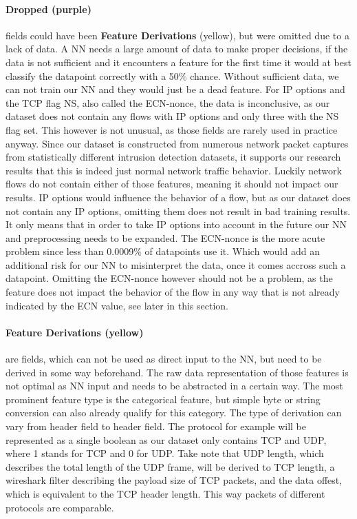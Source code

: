 \documentclass[
	ngerman,
	ruledheaders=section,%
	class=report,%
	thesis={type=bachelor},%
	accentcolor=9c,%
	custommargins=true,%
	marginpar=false,%
	parskip=half-,%
	fontsize=11pt,%
]{tudapub}
\begin{document}
\paragraph{\colorbox{dropped}{\textbf{Dropped} (purple)}} fields could have been \colorbox{derivation}{\textbf{Feature Derivations} (yellow)}, but were omitted due to a lack of data.
A NN needs a large amount of data to make proper decisions, if the data is not sufficient and it encounters a feature for the first time it would at best classify the datapoint correctly with a 50\% chance.
Without sufficient data, we can not train our NN and they would just be a dead feature.
For IP options and the TCP flag NS, also called the ECN-nonce, the data is inconclusive,
as our dataset does not contain any flows with IP options and only three with the NS flag set.
This however is not unusual, as those fields are rarely used in practice anyway.
Since our dataset is constructed from numerous network packet captures from statistically different intrusion detection datasets,
it supports our research results that this is indeed just normal network traffic behavior.
Luckily network flows do not contain either of those features, meaning it should not impact our results.
IP options would influence the behavior of a flow, but as our dataset does not contain any IP options, omitting them does not result in bad training results.
It only means that in order to take IP options into account in the future our NN and preprocessing needs to be expanded.
The ECN-nonce is the more acute problem since less than 0.0009\% of datapoints use it. %
Which would add an additional risk for our NN to misinterpret the data, once it comes accross such a datapoint.
Omitting the ECN-nonce however should not be a problem, as the feature does not impact the behavior of the flow in any way that is not already indicated by the ECN value, see later in this section.

\paragraph{\colorbox{derivation}{\textbf{Feature Derivations} (yellow)}} are fields, which can not be used as direct input to the NN,
but need to be derived in some way beforehand.
The raw data representation of those features is not optimal as NN input and needs to be abstracted in a certain way.
The most prominent feature type is the categorical feature, but simple byte or string conversion can also already qualify for this category.
The type of derivation can vary from header field to header field.
The protocol for example will be represented as a single boolean as our dataset only contains TCP and UDP, where 1 stands for TCP and 0 for UDP.
Take note that UDP length, which describes the total length of the UDP frame, will be derived to TCP length, a wireshark filter describing the payload size of TCP packets, and the data offest, which is equivalent to the TCP header length.
This way packets of different protocols are comparable.
\end{document}
